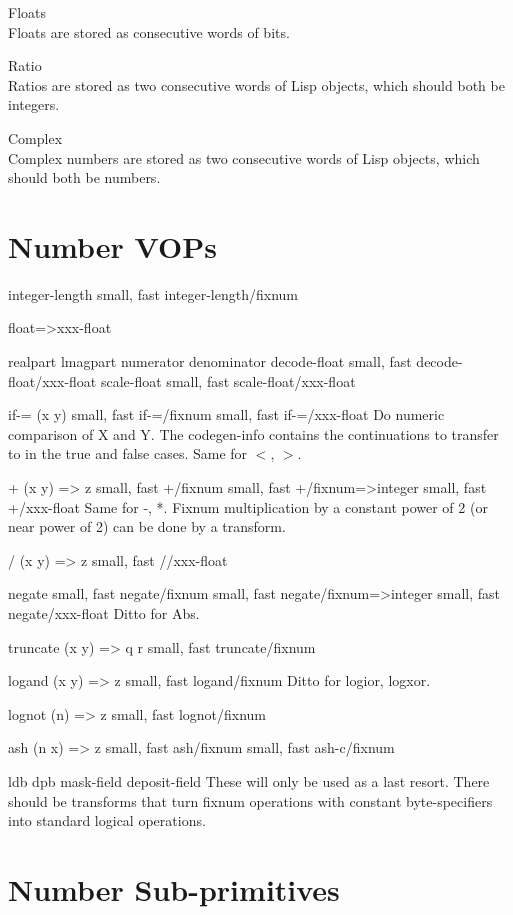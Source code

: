 {
Floats\\Floats are stored as consecutive words of bits.

Ratio\\Ratios are stored as two consecutive words of Lisp objects, which should
both be integers.

Complex\\Complex numbers are stored as two consecutive words of Lisp objects,
which should both be numbers.



\section{Number VOPs}

integer-length
{small, fast} integer-length/fixnum

float=>xxx-float

realpart
lmagpart
numerator
denominator
decode-float
{small, fast} decode-float/xxx-float
scale-float
{small, fast} scale-float/xxx-float

if-= (x y)
{small, fast} if-=/fixnum
{small, fast} if-=/xxx-float
    Do numeric comparison of X and Y.  The codegen-info contains the
    continuations to transfer to in the true and false cases.  Same for $<$, $>$.

+ (x y) => z
{small, fast} +/fixnum
{small, fast} +/fixnum=>integer
{small, fast} +/xxx-float
    Same for -, *.   Fixnum multiplication by a constant power of 2 (or near
    power of 2) can be done by a transform.

/ (x y) => z
{small, fast} //xxx-float

negate
{small, fast} negate/fixnum
{small, fast} negate/fixnum=>integer
{small, fast} negate/xxx-float
    Ditto for Abs.

truncate (x y) => q r
{small, fast} truncate/fixnum

logand (x y) => z
{small, fast} logand/fixnum
    Ditto for logior, logxor.
    
lognot (n) => z
{small, fast} lognot/fixnum

ash (n x) => z
{small, fast} ash/fixnum
{small, fast} ash-c/fixnum

ldb
dpb
mask-field
deposit-field
    These will only be used as a last resort.  There should be transforms that
    turn fixnum operations with constant byte-specifiers into standard logical
    operations.


\section{Number Sub-primitives}


}
